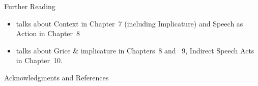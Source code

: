 \documentclass{beamer}
\begin{document}

\begin{frame}{Further Reading}

\begin{itemize}
\item  \citet{Saeed:2015} talks about Context in Chapter~7 (including Implicature) and  Speech as Action in Chapter~8
\item  \citet{Kroeger:2022} talks about Grice \& implicature in Chapters~8 and ~9, Indirect Speech Acts in Chapter~10.
\end{itemize}
\end{frame}



\begin{frame}[allowframebreaks]{Acknowledgments and References}

\small



\end{frame}
\end{document}
